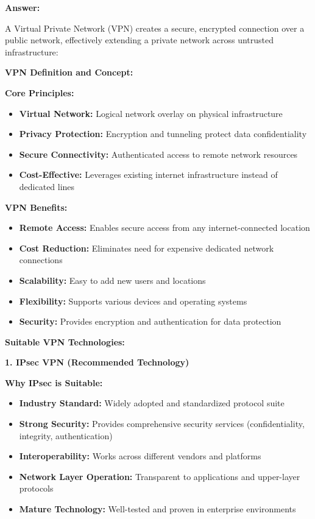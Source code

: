\documentclass[12pt,a4paper]{article}
\begin{document}
\textbf{Answer:}

A Virtual Private Network (VPN) creates a secure, encrypted connection over a public network, effectively extending a private network across untrusted infrastructure:

\textbf{VPN Definition and Concept:}

\textbf{Core Principles:}
\begin{itemize}
    \item \textbf{Virtual Network:} Logical network overlay on physical infrastructure
    \item \textbf{Privacy Protection:} Encryption and tunneling protect data confidentiality
    \item \textbf{Secure Connectivity:} Authenticated access to remote network resources
    \item \textbf{Cost-Effective:} Leverages existing internet infrastructure instead of dedicated lines
\end{itemize}

\textbf{VPN Benefits:}
\begin{itemize}
    \item \textbf{Remote Access:} Enables secure access from any internet-connected location
    \item \textbf{Cost Reduction:} Eliminates need for expensive dedicated network connections
    \item \textbf{Scalability:} Easy to add new users and locations
    \item \textbf{Flexibility:} Supports various devices and operating systems
    \item \textbf{Security:} Provides encryption and authentication for data protection
\end{itemize}

\textbf{Suitable VPN Technologies:}

\textbf{1. IPsec VPN (Recommended Technology)}

\textbf{Why IPsec is Suitable:}
\begin{itemize}
    \item \textbf{Industry Standard:} Widely adopted and standardized protocol suite
    \item \textbf{Strong Security:} Provides comprehensive security services (confidentiality, integrity, authentication)
    \item \textbf{Interoperability:} Works across different vendors and platforms
    \item \textbf{Network Layer Operation:} Transparent to applications and upper-layer protocols
    \item \textbf{Mature Technology:} Well-tested and proven in enterprise environments
\end{itemize}
\end{document}
